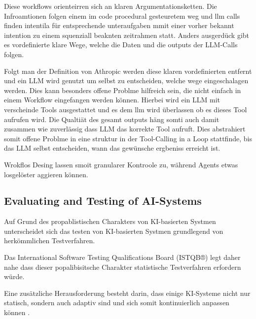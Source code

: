 Diese workflows orienteirren sich an klaren Argumentationsketten. Die Infroamtionen folgen einem im code
procedural gesteuretem weg und llm calls finden intentila für entsprechende unteraufgaben mmit einer vorher
bekannt intention zu einem squenziall beaknten zeitrahmen statt. Anders ausgerdück gibt es vordefinierte
klare Wege, welche die Daten und die outputs der LLM-Calls folgen.

Folgt man der Definition von Athropic werden diese klaren vordefinierten entfernt und ein LLM wird
genutzt um selbst zu entscheiden, welche wege eingeschalagen werden. Dies kann besonders offene Problme
hilfreich sein, die nicht einfach in einem Workflow eingefangen werden können. Hierbei wird ein LLM mit
verscheinde Tools ausgestattet und es dem llm wird überlassen ob es dieses Tool aufrufen wird. Die Qualtiät
des gesamt outputs häng somti auch damit zusammen wie zuverlässig dass LLM das korrekte Tool aufruft. Dies
abstrahiert somit offene Problme in eine struktur in der Tool-Calling in a Loop stattfinde, bis das LLM
selbst entscheiden, wann das gewünsche ergbeniss erreicht ist.

Wrokflos Desing lassen smoit granularer Kontroole zu, während Agents etwas losgelöster aggieren können.

\subsection{Evaluating and Testing of AI-Systems}

Auf Grund des propablistischen Charakters von KI-basierten Systmen unterscheidet sich das testen von
KI-basierten Systmen grundlegend von herkömmlichen Testverfahren.

Das International Software Testing Qualifications Board (ISTQB®) legt daher nahe dass dieser popalibisitsche
Charakter statistische Testverfahren erfordern würde. \cite[p. 39]{istqbrISTQBCertifiedTester}

Eine zusätzliche Herausforderung besteht darin, dass einige KI-Systeme nicht nur statisch, sondern auch
adaptiv sind und sich somit kontinuierlich anpassen können \cite[p.~39]{istqbrISTQBCertifiedTester}.

